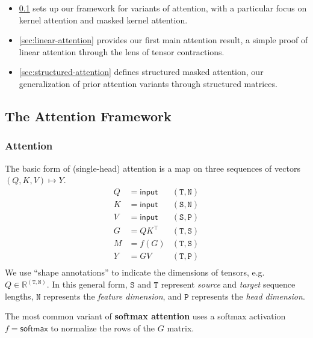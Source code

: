 \documentclass{article}
\newcommand{\R}{\mathbb{R}}
\begin{document}
\begin{itemize}
  \item \cref{sec:masked-attention} sets up our framework for variants of attention, with a particular focus on kernel attention and masked kernel attention.
  \item \cref{sec:linear-attention} provides our first main attention result, a simple proof of linear attention through the lens of tensor contractions.
  \item \cref{sec:structured-attention} defines structured masked attention, our generalization of prior attention variants through structured matrices.
\end{itemize}

\subsection{The Attention Framework}
\label{sec:masked-attention}

\subsubsection{Attention}
The basic form of (single-head) attention is a map on three sequences of vectors $(Q, K, V) \mapsto Y$.
\begin{equation}
  \label{eq:kernel-attention}
  \begin{aligned}
    Q &= \mathsf{input} & \mathtt{(T,N)} \\
    K &= \mathsf{input} & \mathtt{(S,N)} \\
    V &= \mathsf{input} & \mathtt{(S,P)} \\
    G &= QK^\top        & \mathtt{(T,S)} \\
    M &= f(G)           & \mathtt{(T,S)} \\
    Y &= GV             & \mathtt{(T,P)} \\
  \end{aligned}
\end{equation}
We use ``shape annotations'' to indicate the dimensions of tensors, e.g.\ $Q \in \R^{\mathtt{(T,N)}}$.
In this general form, $\mathtt{S}$ and $\mathtt{T}$ represent \emph{source} and \emph{target} sequence lengths,
$\mathtt{N}$ represents the \emph{feature dimension}, and $\mathtt{P}$ represents the \emph{head dimension}.

The most common variant of \textbf{softmax attention} uses a softmax activation $f=\mathsf{softmax}$ to normalize the rows of the $G$ matrix.
\end{document}
